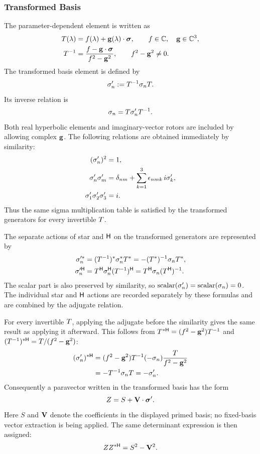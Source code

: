 \subsubsection{Transformed Basis}
The parameter-dependent element is written as
\begin{align*}
T(\lambda)&=f(\lambda)+\mathbf{g}(\lambda)\cdot\mathbf{\bm{\sigma}},
\qquad f\in\mathbb{C},\quad \mathbf{g}\in\mathbb{C}^3,\\
T^{-1}&=\frac{f-\mathbf{g}\cdot\mathbf{\bm{\sigma}}}{f^2-\mathbf{g}^2},
\qquad f^2-\mathbf{g}^2\neq0.
\end{align*}
The transformed basis element is defined by
\begin{equation}
\sigma_n':=T^{-1}\sigma_nT.
\label{eq:transformed-basis-definition}
\end{equation}
Its inverse relation is
\[
\sigma_n=T\sigma_n'T^{-1}.
\]
Both real hyperbolic elements and imaginary-vector rotors are included by
allowing complex \(\mathbf{g}\). The following relations are obtained
immediately by similarity:
\begin{align*}
(\sigma_n')^2&=1,\\
\sigma_n'\sigma_m'
&=\delta_{nm}+\sum_{k=1}^3\epsilon_{nmk}\,i\sigma_k',\\
\sigma_1'\sigma_2'\sigma_3'&=i.
\end{align*}
Thus the same sigma multiplication table is satisfied by the transformed
generators for every invertible \(T\).

The separate actions of star and \(\mathsf H\) on the transformed
generators are represented by
\begin{align*}
\sigma_n'^{*}
&=(T^{-1})^{*}\sigma_n^{*}T^{*}
=-(T^{*})^{-1}\sigma_nT^{*},\\
\sigma_n'^{\mathsf H}
&=T^{\mathsf H}\sigma_n^{\mathsf H}(T^{-1})^{\mathsf H}
=T^{\mathsf H}\sigma_n(T^{\mathsf H})^{-1}.
\end{align*}
The scalar part is also preserved by similarity, so
\(\operatorname{scalar}(\sigma_n')=\operatorname{scalar}(\sigma_n)=0\).
The individual star and \(\mathsf H\) actions are recorded separately by these
formulas and are combined by the adjugate relation.

For every invertible \(T\), applying the adjugate before the similarity
gives the same result as applying it afterward. This follows from
\(T^{*\mathsf H}=(f^2-\mathbf{g}^2)T^{-1}\) and
\((T^{-1})^{*\mathsf H}=T/(f^2-\mathbf{g}^2)\):
\begin{align*}
(\sigma_n')^{*\mathsf H}
&=(f^2-\mathbf{g}^2)T^{-1}(-\sigma_n)
  \frac{T}{f^2-\mathbf{g}^2}\\
&=-T^{-1}\sigma_nT=-\sigma_n'.
\end{align*}
Consequently a paravector written in the transformed basis has the form
\[
Z
=S+\mathbf{V}\cdot\mathbf{\bm{\sigma}}'.
\]
Here \(S\) and \(\mathbf{V}\) denote the coefficients in the displayed primed
basis; no fixed-basis vector extraction is being applied. The same
determinant expression is then assigned:
\[
ZZ^{*\mathsf H}
=S^2-\mathbf{V}^2.
\]

